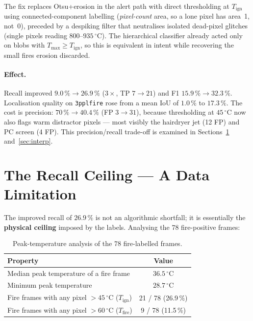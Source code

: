 \documentclass[11pt, a4paper]{article}
\begin{document}
The fix replaces Otsu+erosion in the alert path with direct thresholding at
$T_{\text{ign}}$ using connected-component labelling (\emph{pixel-count} area, so a lone
pixel has area~1, not~0), preceded by a despiking filter that neutralises isolated
dead-pixel glitches (single pixels reading $800$--$935\,^\circ$C).  The hierarchical
classifier already acted only on blobs with $T_{\max}\ge T_{\text{ign}}$, so this is
equivalent in intent while recovering the small fires erosion discarded.

\paragraph{Effect.}  Recall improved $\mathbf{9.0\,\% \rightarrow 26.9\,\%}$
($3\times$, TP $7\rightarrow21$) and F1 $\mathbf{15.9\,\% \rightarrow 32.3\,\%}$.
Localisation quality on \texttt{3pplfire} rose from a mean IoU of $1.0\,\%$ to
$17.3\,\%$.  The cost is precision: $70\,\% \rightarrow 40.4\,\%$ (FP $3\rightarrow31$),
because thresholding at $45\,^\circ$C now also flags warm distractor pixels — most
visibly the hairdryer jet (12 FP) and PC screen (4 FP).  This precision/recall trade-off
is examined in Sections~\ref{sec:ceiling} and~\ref{sec:interp}.

\section{The Recall Ceiling — A Data Limitation}\label{sec:ceiling}

The improved recall of $26.9\,\%$ is not an algorithmic shortfall; it is essentially the
\textbf{physical ceiling} imposed by the labels.  Analysing the 78 fire-positive frames:

\begin{table}[H]
\centering
\caption{Peak-temperature analysis of the 78 fire-labelled frames.}
\renewcommand{\arraystretch}{1.3}
\begin{tabular}{lc}
\toprule
\textbf{Property} & \textbf{Value} \\
\midrule
Median peak temperature of a fire frame      & $36.5\,^\circ$C \\
Minimum peak temperature                      & $28.7\,^\circ$C \\
Fire frames with any pixel $>45\,^\circ$C ($T_{\text{ign}}$) & 21 / 78 \;(26.9\,\%) \\
Fire frames with any pixel $>60\,^\circ$C ($T_{\text{fire}}$) & 9 / 78 \;(11.5\,\%) \\
\bottomrule
\end{tabular}
\label{tab:ceiling}
\end{table}
\end{document}

